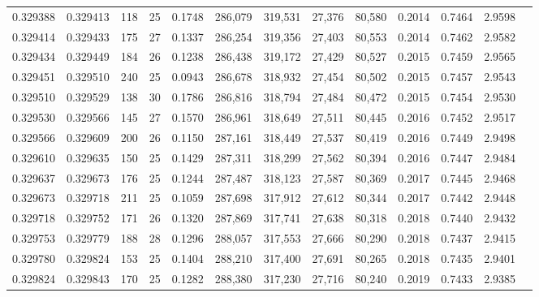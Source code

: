 \begin{tabular}{rrrrrrrrrrrrr}
0.329388 & 0.329413 &   118 &  25 &                                     0.1748 & 286,079 & 319,531 &  27,376 &  80,580 & 0.2014 & 0.7464 & 2.9598 \\
0.329414 & 0.329433 &   175 &  27 &                                     0.1337 & 286,254 & 319,356 &  27,403 &  80,553 & 0.2014 & 0.7462 & 2.9582 \\
0.329434 & 0.329449 &   184 &  26 &                                     0.1238 & 286,438 & 319,172 &  27,429 &  80,527 & 0.2015 & 0.7459 & 2.9565 \\
0.329451 & 0.329510 &   240 &  25 &                                     0.0943 & 286,678 & 318,932 &  27,454 &  80,502 & 0.2015 & 0.7457 & 2.9543 \\
0.329510 & 0.329529 &   138 &  30 &                                     0.1786 & 286,816 & 318,794 &  27,484 &  80,472 & 0.2015 & 0.7454 & 2.9530 \\
0.329530 & 0.329566 &   145 &  27 &                                     0.1570 & 286,961 & 318,649 &  27,511 &  80,445 & 0.2016 & 0.7452 & 2.9517 \\
0.329566 & 0.329609 &   200 &  26 &                                     0.1150 & 287,161 & 318,449 &  27,537 &  80,419 & 0.2016 & 0.7449 & 2.9498 \\
0.329610 & 0.329635 &   150 &  25 &                                     0.1429 & 287,311 & 318,299 &  27,562 &  80,394 & 0.2016 & 0.7447 & 2.9484 \\
0.329637 & 0.329673 &   176 &  25 &                                     0.1244 & 287,487 & 318,123 &  27,587 &  80,369 & 0.2017 & 0.7445 & 2.9468 \\
0.329673 & 0.329718 &   211 &  25 &                                     0.1059 & 287,698 & 317,912 &  27,612 &  80,344 & 0.2017 & 0.7442 & 2.9448 \\
0.329718 & 0.329752 &   171 &  26 &                                     0.1320 & 287,869 & 317,741 &  27,638 &  80,318 & 0.2018 & 0.7440 & 2.9432 \\
0.329753 & 0.329779 &   188 &  28 &                                     0.1296 & 288,057 & 317,553 &  27,666 &  80,290 & 0.2018 & 0.7437 & 2.9415 \\
0.329780 & 0.329824 &   153 &  25 &                                     0.1404 & 288,210 & 317,400 &  27,691 &  80,265 & 0.2018 & 0.7435 & 2.9401 \\
0.329824 & 0.329843 &   170 &  25 &                                     0.1282 & 288,380 & 317,230 &  27,716 &  80,240 & 0.2019 & 0.7433 & 2.9385 \\

\end{tabular}
